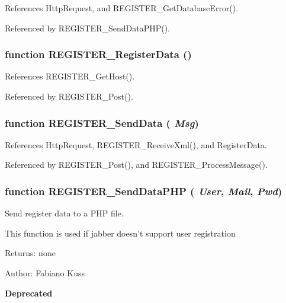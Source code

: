 References HttpRequest, and REGISTER\_\-GetDatabaseError().

Referenced by REGISTER\_\-SendDataPHP().
\subsubsection[REGISTER\_\-RegisterData]{\setlength{\rightskip}{0pt plus 5cm}function REGISTER\_\-RegisterData ()}\label{register_8js_387c9e547a2a2c6b8bb3daa4b82e5645}




References REGISTER\_\-GetHost().

Referenced by REGISTER\_\-Post().
\subsubsection[REGISTER\_\-SendData]{\setlength{\rightskip}{0pt plus 5cm}function REGISTER\_\-SendData ( {\em Msg})}\label{register_8js_fcb0616848b3086105c609ff09fb56c2}




References HttpRequest, REGISTER\_\-ReceiveXml(), and RegisterData.

Referenced by REGISTER\_\-Post(), and REGISTER\_\-ProcessMessage().
\subsubsection[REGISTER\_\-SendDataPHP]{\setlength{\rightskip}{0pt plus 5cm}function REGISTER\_\-SendDataPHP ( {\em User}, \/   {\em Mail}, \/   {\em Pwd})}\label{register_8js_6785efd4f9728ecdfca686884a471657}


Send register data to a PHP file. 

This function is used if jabber doesn't support user registration

\begin{Desc}
\item[Returns:]none \end{Desc}
\begin{Desc}
\item[Author:]Fabiano Kuss\end{Desc}
\begin{Desc}
\item[{\bf Deprecated}]\end{Desc}


